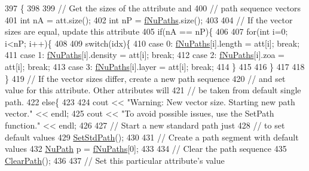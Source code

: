 \begin{DoxyCode}
397                                                     \{
398 
399   \textcolor{comment}{// Get the sizes of the attribute and}
400   \textcolor{comment}{// path sequence vectors}
401   \textcolor{keywordtype}{int} nA = att.size();
402   \textcolor{keywordtype}{int} nP = \hyperlink{classOscProb_1_1PMNS__Base_a69db9d57e12fc7cbe0431bc6c18fac93}{fNuPaths}.size();
403 
404   \textcolor{comment}{// If the vector sizes are equal, update this attribute}
405   \textcolor{keywordflow}{if}(nA == nP)\{
406 
407     \textcolor{keywordflow}{for}(\textcolor{keywordtype}{int} i=0; i<nP; i++)\{
408 
409       \textcolor{keywordflow}{switch}(idx)\{
410         \textcolor{keywordflow}{case} 0: \hyperlink{classOscProb_1_1PMNS__Base_a69db9d57e12fc7cbe0431bc6c18fac93}{fNuPaths}[i].length  = att[i]; \textcolor{keywordflow}{break};
411         \textcolor{keywordflow}{case} 1: \hyperlink{classOscProb_1_1PMNS__Base_a69db9d57e12fc7cbe0431bc6c18fac93}{fNuPaths}[i].density = att[i]; \textcolor{keywordflow}{break};
412         \textcolor{keywordflow}{case} 2: \hyperlink{classOscProb_1_1PMNS__Base_a69db9d57e12fc7cbe0431bc6c18fac93}{fNuPaths}[i].zoa     = att[i]; \textcolor{keywordflow}{break};
413         \textcolor{keywordflow}{case} 3: \hyperlink{classOscProb_1_1PMNS__Base_a69db9d57e12fc7cbe0431bc6c18fac93}{fNuPaths}[i].layer   = att[i]; \textcolor{keywordflow}{break};
414       \}
415 
416     \}
417 
418   \}
419   \textcolor{comment}{// If the vector sizes differ, create a new path sequence}
420   \textcolor{comment}{// and set value for this attribute. Other attributes will}
421   \textcolor{comment}{// be taken from default single path.}
422   \textcolor{keywordflow}{else}\{
423 
424     cout << \textcolor{stringliteral}{"Warning: New vector size. Starting new path vector."} << endl;
425     cout << \textcolor{stringliteral}{"To avoid possible issues, use the SetPath function."} << endl;
426 
427     \textcolor{comment}{// Start a new standard path just}
428     \textcolor{comment}{// to set default values}
429     \hyperlink{classOscProb_1_1PMNS__Base_add6533a9fc9acdfc7ae258b62570d78d}{SetStdPath}();
430 
431     \textcolor{comment}{// Create a path segment with default values}
432     \hyperlink{structOscProb_1_1NuPath}{NuPath} p = \hyperlink{classOscProb_1_1PMNS__Base_a69db9d57e12fc7cbe0431bc6c18fac93}{fNuPaths}[0];
433 
434     \textcolor{comment}{// Clear the path sequence}
435     \hyperlink{classOscProb_1_1PMNS__Base_aefe521239031c418cfaaaa550a6e13bb}{ClearPath}();
436 
437     \textcolor{comment}{// Set this particular attribute's value}

\end{DoxyCode}
